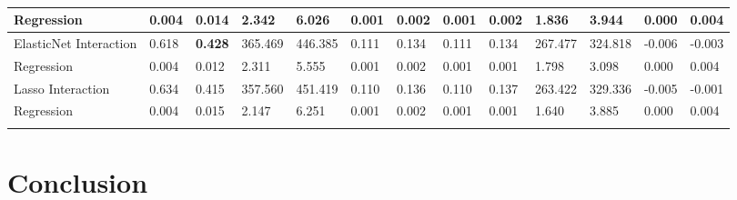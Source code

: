 \documentclass{article}
\begin{document}
{\begin{longtable}[c]{|p{2.3cm}|ll|ll|ll|ll|ll|ll|}
  Regression & \multicolumn{1}{l|}{0.004} & 0.014 & \multicolumn{1}{l|}{2.342}   & 6.026   & \multicolumn{1}{l|}{0.001} & 0.002 & \multicolumn{1}{l|}{0.001} & 0.002 & \multicolumn{1}{l|}{1.836}   & 3.944   & \multicolumn{1}{l|}{0.000}  & 0.004  \\ \hline
  ElasticNet Interaction & \multicolumn{1}{l|}{0.618} & \textbf{0.428} & \multicolumn{1}{l|}{365.469} & 446.385 & \multicolumn{1}{l|}{0.111} & 0.134 & \multicolumn{1}{l|}{0.111} & 0.134 & \multicolumn{1}{l|}{267.477} & 324.818 & \multicolumn{1}{l|}{-0.006} & -0.003 \\
  Regression & \multicolumn{1}{l|}{0.004} & 0.012 & \multicolumn{1}{l|}{2.311}   & 5.555   & \multicolumn{1}{l|}{0.001} & 0.002 & \multicolumn{1}{l|}{0.001} & 0.001 & \multicolumn{1}{l|}{1.798}   & 3.098   & \multicolumn{1}{l|}{0.000}  & 0.004  \\ \hline
  Lasso Interaction & \multicolumn{1}{l|}{0.634} & 0.415 & \multicolumn{1}{l|}{357.560} & 451.419 & \multicolumn{1}{l|}{0.110} & 0.136 & \multicolumn{1}{l|}{0.110} & 0.137 & \multicolumn{1}{l|}{263.422} & 329.336 & \multicolumn{1}{l|}{-0.005} & -0.001 \\
  Regression & \multicolumn{1}{l|}{0.004} & 0.015 & \multicolumn{1}{l|}{2.147}   & 6.251   & \multicolumn{1}{l|}{0.001} & 0.002 & \multicolumn{1}{l|}{0.001} & 0.001 & \multicolumn{1}{l|}{1.640}   & 3.885   & \multicolumn{1}{l|}{0.000}  & 0.004  \\ \hline
  \caption{}
  \label{tab:my-table}\\
  \end{longtable}}

  \section{Conclusion}


\printbibliography
\end{document}
